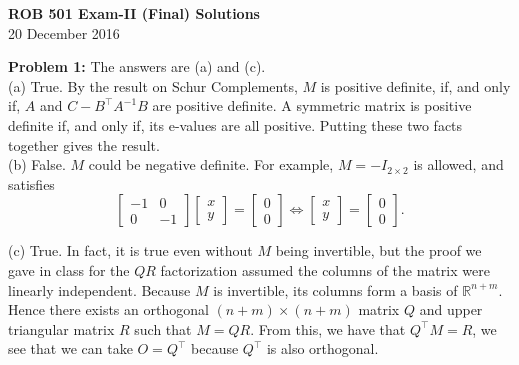 \documentclass[letterpaper]{article}
\begin{document}
\newcommand{\trace}{\mathrm{trace}}
\newcommand{\real}{\mathbb R}  %
\newcommand{\nat}{\mathbb R}   %
\newcommand{\cp}{\mathbb C}    %
\newcommand{\ds}{\displaystyle}
\newcommand{\mf}[2]{\frac{\ds #1}{\ds #2}}
\newcommand{\book}[2]{{Luenberger, Page~#1, }{Prob.~#2}}
\newcommand{\spanof}[1]{\textrm{span} \{ #1 \}}
 \newcommand{\cov}{\mathrm{cov}}
 \newcommand{\E}{\mathcal{E}}
\parindent 0pt


\begin{center}
{\large \bf ROB 501 Exam-II (Final) Solutions}\\
20 December 2016
\end{center}

\vspace*{1cm}

\noindent \textbf{Problem 1:} The answers are (a) and (c). \\

(a) True. By the result on Schur Complements, $M$ is positive definite, if, and only if, $A$ and $C-B^\top A^{-1} B $ are positive definite. A symmetric matrix is positive definite if, and only if, its e-values are all positive. Putting these two facts together gives the result.\\

(b) False. $M$ could be negative definite. For example, $M=-I_{2 \times 2}$ is allowed, and satisfies
$$ \left[ \begin{array}{rr} -1&0 \\ 0 &-1 \end{array} \right] \left[ \begin{array}{c} x \\ y\end{array} \right]= \left[ \begin{array}{c} 0\\ 0\end{array} \right] \Leftrightarrow \left[ \begin{array}{c} x \\ y\end{array} \right]= \left[ \begin{array}{c} 0\\ 0\end{array} \right].$$

(c) True. In fact, it is true even without $M$ being invertible, but the proof we gave in class for the $QR$ factorization assumed the columns of the matrix were linearly independent. Because $M$ is invertible, its columns form a basis of $\real^{n+m}$. Hence there exists an orthogonal $(n+m)\times (n+m)$ matrix $Q$ and upper triangular matrix $R$ such that $M=QR$. From this, we have that $Q^\top M=R$, we see that we can take $O=Q^\top$ because $Q^\top$ is also orthogonal.
\end{document}
